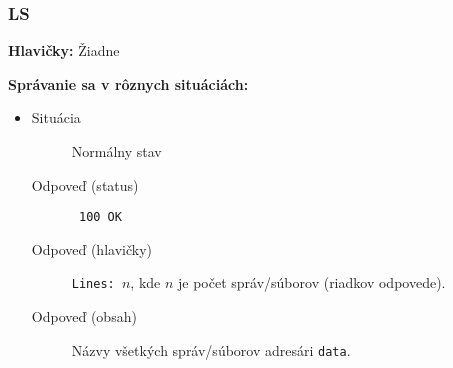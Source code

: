 \subsubsection{ LS }
\noindent\textbf{Hlavičky:}
Žiadne

\noindent\textbf{Správanie sa v rôznych situáciách:}
\begin{itemize}
\item
\begin{description}
\item[Situácia]
Normálny stav
\item[Odpoveď (status)]
\texttt{ 100 OK }
\item[Odpoveď (hlavičky)]
\texttt{Lines: $n$}, kde $n$ je počet správ/súborov (riadkov odpovede).
\item[Odpoveď (obsah)]
Názvy všetkých správ/súborov adresári \texttt{data}.
\end{description}
\end{itemize}
